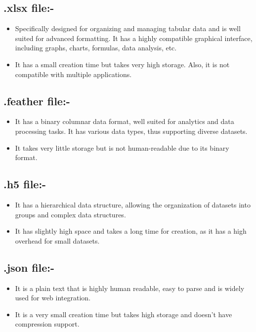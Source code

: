 \documentclass[11pt]{article}
\begin{document}
\subsection{.xlsx file:-}
\begin{itemize}
    \item Specifically designed for organizing and managing tabular data and is well suited for advanced formatting. It has a highly compatible graphical interface, including graphs, charts, formulas, data analysis, etc.
    \item It has a small creation time but takes very high storage. Also, it is not compatible with multiple applications.
\end{itemize}

\subsection{.feather file:-}
\begin{itemize}
    \item It has a binary columnar data format, well suited for analytics and data processing tasks. It has various data types, thus supporting diverse datasets.
    \item It takes very little storage but is not human-readable due to its binary format.
\end{itemize}

\subsection{.h5 file:-}
\begin{itemize}
    \item It has a hierarchical data structure, allowing the organization of datasets into groups and complex data structures.
    \item It has slightly high space and takes a long time for creation, as it has a high overhead for small datasets.
\end{itemize}

\subsection{.json file:-}
\begin{itemize}
    \item It is a plain text that is highly human readable, easy to parse and is widely used for web integration.
    \item It is a very small creation time but takes high storage and doesn't have compression support.
\end{itemize}
\end{document}
